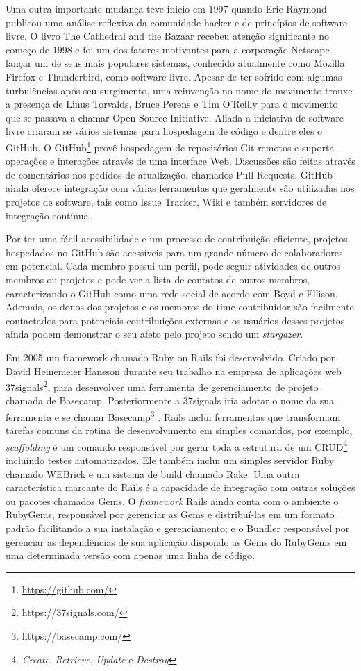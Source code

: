 Uma outra importante mudança teve inicio em 1997 quando Eric Raymond publicou uma análise reflexiva da comunidade hacker e de princípios de software livre. O livro The Cathedral and the Bazaar \cite{Raymond:2001:CBM:365399} recebeu atenção significante no começo de 1998 e foi um dos fatores motivantes para a corporação Netscape lançar um de seus mais populares sistemas, conhecido atualmente como Mozilla Firefox e Thunderbird, como software livre. Apesar de ter sofrido com algumas turbulências após seu surgimento, uma reinvenção no nome do movimento trouxe a presença de Linus Torvalds, Bruce Perens e Tim O'Reilly para o movimento que se passava a chamar Open Source Initiative\cite{osi2012}. Aliada a iniciativa de software livre criaram se vários sistemas para hospedagem de código e dentre eles o GitHub. O GitHub\footnote{\url{https://github.com/}} provê hospedagem de repositórios Git remotos e suporta operações e interações através de uma interface Web. Discussões são feitas através de comentários nos pedidos de atualização, chamados Pull Requests. GitHub ainda oferece integração com várias ferramentas que geralmente são utilizadas nos projetos de software, tais como Issue Tracker, Wiki e também servidores de integração contínua.

Por ter uma fácil acessibilidade e um processo de contribuição eficiente, projetos hospedados no GitHub são acessíveis para um grande número de colaboradores em potencial. Cada membro possui um perfil, pode seguir atividades de outros membros ou projetos e pode ver a lista de contatos de outros membros, caracterizando o GitHub como uma rede social de acordo com Boyd e Ellison\cite{2007:00393}. Ademais, os donos dos projetos e os membros do time contribuidor são facilmente contactados para potenciais contribuições externas e os usuários desses projetos ainda podem demonstrar o seu afeto pelo projeto sendo um \textit{stargazer}\cite{Pham:2013:CSU:2486788.2486804}.

	Em 2005 um framework chamado Ruby on Rails foi desenvolvido. Criado por David Heinemeier Hansson durante seu trabalho na empresa de aplicações web 37signals\footnote{https://37signals.com/}, para desenvolver uma ferramenta de gerenciamento de projeto chamada de Basecamp. Posteriormente a 37signals iria adotar o nome da sua ferramenta e se chamar Basecamp\footnote{https://basecamp.com/} \cite{grimmer2006}. Rails inclui ferramentas que transformam tarefas comuns da rotina de desenvolvimento em simples comandos, por exemplo, \textit{scaffolding} é um comando responsável por gerar toda a estrutura de um CRUD\footnote{\textit{Create}, \textit{Retrieve}, \textit{Update} e \textit{Destroy}} incluindo testes automatizados. Ele também inclui um simples servidor Ruby chamado WEBrick e um sistema de build chamado Rake. Uma outra característica marcante do Rails é a capacidade de integração com outras soluções ou pacotes chamados Gems. O \textit{framework} Rails ainda conta com  o ambiente o RubyGems, responsável por gerenciar as Gems e distribuí-las em um formato padrão facilitando a sua instalação e gerenciamento; e o Bundler responsável por gerenciar as dependências de sua aplicação dispondo as Gems do RubyGems em uma determinada versão com apenas uma linha de código.


